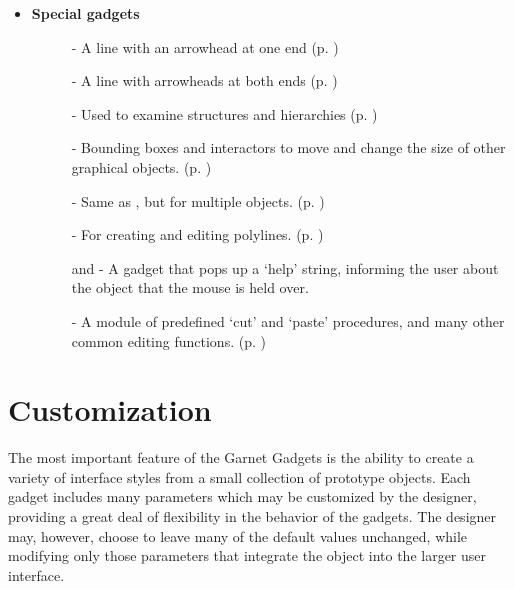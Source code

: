 \begin{itemize}
\item \begin{group}
{\bf Special gadgets}
\begin{description}
\item[]  - A line with an arrowhead at one end
(p. \pageref{arrow-line})

\item[]  - A line with arrowheads at both ends
(p. \pageref{double-arrow-line})

\item[]  - Used to examine structures and hierarchies
(p. \pageref{browser-gadget})

\item[]  - Bounding boxes and
interactors to move and change the size of other graphical objects.
(p. \pageref{graphics-selection})

\item[]  - Same as , but for
multiple objects.  (p. \pageref{multi-gs})

\item[]  - For creating and editing polylines.
(p. \pageref{polyline-creator})

\item[]  and  - A gadget that pops up a `help' string,
informing the user about the object that the mouse is held over.

\item[]  - A module of predefined `cut' and `paste' procedures,
and many other common editing functions.  (p. \pageref{standardeditsec})
\end{description}
\end{group}
\end{itemize}



\section{Customization}
 The most important feature of the Garnet Gadgets
is the ability to create a variety of interface styles from a small
collection of prototype objects.  Each gadget includes many parameters
which may be customized by the designer, providing a great deal of
flexibility in the behavior of the gadgets.  The designer may,
however, choose to leave many of the default values unchanged, while
modifying only those parameters that integrate the object into the
larger user interface.

